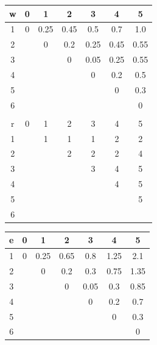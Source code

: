 \documentclass{article}
\begin{document}
\begin{multicols*}{2}
    \hspace*{-1.5em}
    \setlength\tabcolsep{2.5pt}
    \begin{multicols}{2}
        \begin{center}
            \begin{tabular}{c|cccccc}
                w & 0 & 1    & 2    & 3    & 4    & 5    \\
                \hline
                1 & 0 & 0.25 & 0.45 & 0.5  & 0.7  & 1.0  \\
                2 &   & 0    & 0.2  & 0.25 & 0.45 & 0.55 \\
                3 &   &      & 0    & 0.05 & 0.25 & 0.55 \\
                4 &   &      &      & 0    & 0.2  & 0.5  \\
                5 &   &      &      &      & 0    & 0.3  \\
                6 &   &      &      &      &      & 0    \\
                \\
                r & 0 & 1    & 2    & 3    & 4    & 5    \\
                \hline
                1 &   & 1    & 1    & 1    & 2    & 2    \\
                2 &   &      & 2    & 2    & 2    & 4    \\
                3 &   &      &      & 3    & 4    & 5    \\
                4 &   &      &      &      & 4    & 5    \\
                5 &   &      &      &      &      & 5    \\
                6 &   &      &      &      &      &      \\
            \end{tabular}
        \end{center}
        \columnbreak
        \begin{center}
            \begin{tabular}{c|cccccc}
                e & 0 & 1    & 2    & 3    & 4    & 5    \\
                \hline
                1 & 0 & 0.25 & 0.65 & 0.8  & 1.25 & 2.1  \\
                2 &   & 0    & 0.2  & 0.3  & 0.75 & 1.35 \\
                3 &   &      & 0    & 0.05 & 0.3  & 0.85 \\
                4 &   &      &      & 0    & 0.2  & 0.7  \\
                5 &   &      &      &      & 0    & 0.3  \\
                6 &   &      &      &      &      & 0    \\
            \end{tabular}


\end{center}
\end{multicols}
\end{multicols*}
\end{document}
